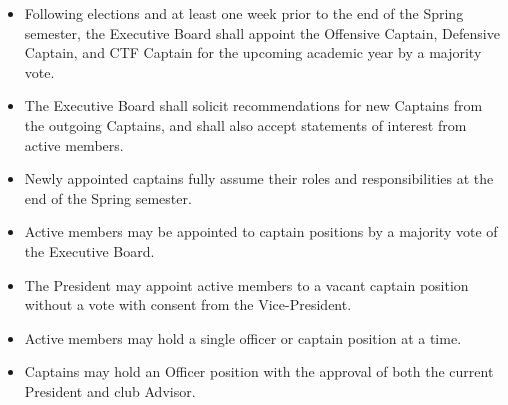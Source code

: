\documentclass[12pt]{article}
\begin{document}
\begin{itemize}
  \item Following elections and at least one week prior to the end of the Spring semester, the Executive Board shall appoint the Offensive Captain, Defensive Captain, and CTF Captain for the upcoming academic year by a majority vote.
  \item The Executive Board shall solicit recommendations for new Captains from the outgoing Captains, and shall also accept statements of interest from active members.
  \item Newly appointed captains fully assume their roles and responsibilities at the end of the Spring semester.
  \item Active members may be appointed to captain positions by a majority vote of the Executive Board.
  \item The President may appoint active members to a vacant captain position without a vote with consent from the Vice-President.
  \item Active members may hold a single officer or captain position at a time.
  \item Captains may hold an Officer position with the approval of both the current President and club Advisor.
\end{itemize}
\end{document}
